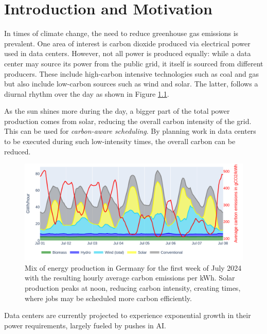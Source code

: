 \chapter{Introduction and Motivation}

In times of climate change, the need to reduce greenhouse gas emissions is prevalent. 
One area of interest is carbon dioxide produced via electrical power used in data centers. 
However, not all power is produced equally: while a data center may source its power from the public grid, it itself is sourced from different producers. 
These include high-carbon intensive technologies such as coal and gas but also include low-carbon sources such as wind and solar. 
The latter, follows a diurnal rhythm over the day as shown in Figure \ref{fig:energy_mix}.

As the sun shines more during the day, a bigger part of the total power production comes from solar, reducing the overall carbon intensity of the grid.
This can be used for \emph{carbon-aware scheduling}. 
By planning work in data centers to be executed during such low-intensity times, the overall carbon can be reduced.

\begin{figure}[H] %
    \includegraphics[width=\linewidth]{agorameter/energy_production_week.pdf}
    \caption[short]{Mix of energy production in Germany for the first week of July 2024 with the resulting hourly average carbon emissions per kWh. Solar production peaks at noon, reducing carbon intensity, creating times, where jobs may be scheduled more carbon efficiently.}
    \label{fig:energy_mix}
\end{figure}

Data centers are currently projected to experience exponential growth in their power requirements, largely fueled by pushes in AI.\cite{schwartz_green_2019}


